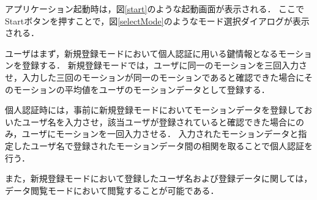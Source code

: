 \documentclass[11pt]{jreport}
\begin{document}
    アプリケーション起動時は，図\ref{start}のような起動画面が表示される．
    ここでStartボタンを押すことで，図\ref{selectMode}のようなモード選択ダイアログが表示される．

    ユーザはまず，新規登録モードにおいて個人認証に用いる鍵情報となるモーションを登録する．
    新規登録モードでは，ユーザに同一のモーションを三回入力させ，入力した三回のモーションが同一のモーションであると確認できた場合にそのモーションの平均値をユーザのモーションデータとして登録する．

    個人認証時には，事前に新規登録モードにおいてモーションデータを登録しておいたユーザ名を入力させ，該当ユーザが登録されていると確認できた場合にのみ，ユーザにモーションを一回入力させる．
    入力されたモーションデータと指定したユーザ名で登録されたモーションデータ間の相関を取ることで個人認証を行う．

    また，新規登録モードにおいて登録したユーザ名および登録データに関しては，データ閲覧モードにおいて閲覧することが可能である．
\end{document}
